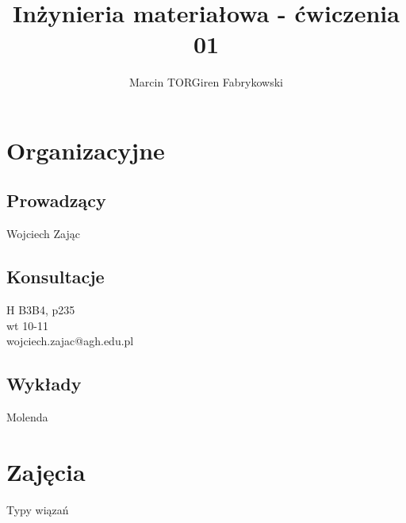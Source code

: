 \documentclass[a4paper,12pt]{article}
\title{Inżynieria materiałowa - ćwiczenia 01}
\author{Marcin TORGiren Fabrykowski}
\begin{document}
\maketitle
\newpage
\section{Organizacyjne}
\subsection{Prowadzący}
Wojciech Zając
\subsection{Konsultacje}
H B3B4, p235\\
wt 10-11\\
wojciech.zajac@agh.edu.pl
\subsection{Wykłady}
Molenda
\section{Zajęcia}
Typy wiązań\\
\end{document}
